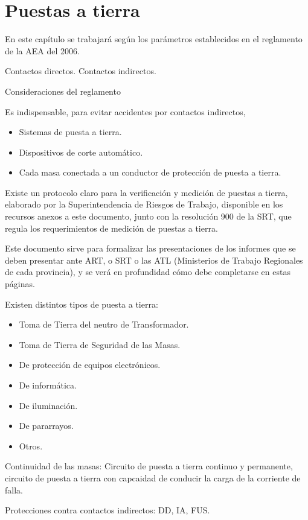 
\chapter{Puestas a tierra}

En este capítulo se trabajará según los parámetros establecidos en el reglamento de la AEA del 2006.

Contactos directos.
Contactos indirectos.

Consideraciones del reglamento

Es indispensable, para evitar accidentes por contactos indirectos,
\begin{itemize}
	\item Sistemas de puesta a tierra.
	\item Dispositivos de corte automático.
	\item Cada masa conectada a un conductor de protección de puesta a tierra.
\end{itemize}

Existe un protocolo claro para la verificación y medición de puestas a tierra, elaborado por la Superintendencia de Riesgos de Trabajo, disponible en los recursos anexos a este documento, junto con la resolución 900 de la SRT, que regula los requerimientos de medición de puestas a tierra.

Este documento sirve para formalizar las presentaciones de los informes que se deben presentar ante ART, o SRT o las ATL (Ministerios de Trabajo Regionales de cada provincia), y se verá en profundidad cómo debe completarse en estas páginas.

Existen distintos tipos de puesta a tierra:
\begin{itemize}
	\item Toma de Tierra del neutro de Transformador.
	\item Toma de Tierra de Seguridad de las Masas.
	\item De protección de equipos electrónicos.
	\item De informática.
	\item De iluminación.
	\item De pararrayos.
	\item Otros.
\end{itemize}

Continuidad de las masas: Circuito de puesta a tierra continuo y permanente, circuito de puesta a tierra con capcaidad de conducir la carga de la corriente de falla.

Protecciones contra contactos indirectos: DD, IA, FUS.

